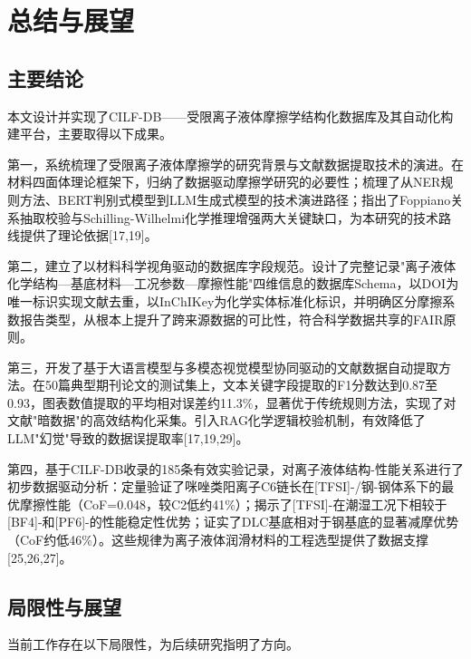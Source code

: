 \hypertarget{ux603bux7ed3ux4e0eux5c55ux671b}{%
\section{总结与展望}\label{ux603bux7ed3ux4e0eux5c55ux671b}}

\hypertarget{ux4e3bux8981ux7ed3ux8bba}{%
\subsection{主要结论}\label{ux4e3bux8981ux7ed3ux8bba}}

本文设计并实现了CILF-DB------受限离子液体摩擦学结构化数据库及其自动化构建平台，主要取得以下成果。

第一，系统梳理了受限离子液体摩擦学的研究背景与文献数据提取技术的演进。在材料四面体理论框架下，归纳了数据驱动摩擦学研究的必要性；梳理了从NER规则方法、BERT判别式模型到LLM生成式模型的技术演进路径；指出了Foppiano关系抽取校验与Schilling-Wilhelmi化学推理增强两大关键缺口，为本研究的技术路线提供了理论依据{[}17,19{]}。

第二，建立了以材料科学视角驱动的数据库字段规范。设计了完整记录"离子液体化学结构---基底材料---工况参数---摩擦性能"四维信息的数据库Schema，以DOI为唯一标识实现文献去重，以InChIKey为化学实体标准化标识，并明确区分摩擦系数报告类型，从根本上提升了跨来源数据的可比性，符合科学数据共享的FAIR原则。

第三，开发了基于大语言模型与多模态视觉模型协同驱动的文献数据自动提取方法。在50篇典型期刊论文的测试集上，文本关键字段提取的F1分数达到0.87至0.93，图表数值提取的平均相对误差约11.3\%，显著优于传统规则方法，实现了对文献"暗数据"的高效结构化采集。引入RAG化学逻辑校验机制，有效降低了LLM"幻觉"导致的数据误提取率{[}17,19,29{]}。

第四，基于CILF-DB收录的185条有效实验记录，对离子液体结构-性能关系进行了初步数据驱动分析：定量验证了咪唑类阳离子C6链长在{[}TFSI{]}-/钢-钢体系下的最优摩擦性能（CoF=0.048，较C2低约41\%）；揭示了{[}TFSI{]}-在潮湿工况下相较于{[}BF4{]}-和{[}PF6{]}-的性能稳定性优势；证实了DLC基底相对于钢基底的显著减摩优势（CoF约低46\%）。这些规律为离子液体润滑材料的工程选型提供了数据支撑{[}25,26,27{]}。

\hypertarget{ux5c40ux9650ux6027ux4e0eux5c55ux671b}{%
\subsection{局限性与展望}\label{ux5c40ux9650ux6027ux4e0eux5c55ux671b}}

当前工作存在以下局限性，为后续研究指明了方向。


